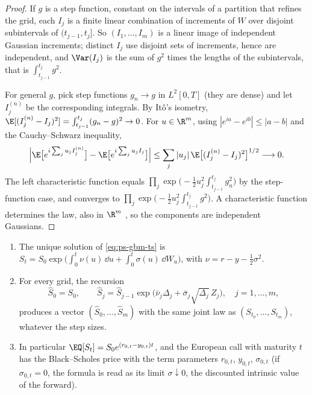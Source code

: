 \begin{proof}
If $g$ is a step function, constant on the intervals of a partition that refines the grid,
each $I_j$ is a finite
linear combination of increments of $W$ over disjoint subintervals of $(t_{j-1},t_j]$. So
$(I_1,\dots,I_m)$ is a linear image of independent Gaussian increments; distinct $I_j$ use
disjoint sets of increments, hence are independent, and $\Var(I_j)$ is the sum of
$g^2$ times the lengths of the subintervals, that is $\int_{t_{j-1}}^{t_j}g^2$.

For general $g$, pick step functions $g_n\to g$ in $L^2[0,T]$ (they are dense) and let
$I^{(n)}_j$ be the corresponding integrals. By It\^o's isometry,
$\E[(I^{(n)}_j-I_j)^2]=\int_{t_{j-1}}^{t_j}(g_n-g)^2\to0$. For $u\in\R^m$, using
$|e^{ia}-e^{ib}|\le|a-b|$ and the Cauchy--Schwarz inequality,
\[
  \Big|\E\big[e^{i\sum_ju_jI^{(n)}_j}\big]-\E\big[e^{i\sum_ju_jI_j}\big]\Big|
  \le\sum_j|u_j|\,\E\big[(I^{(n)}_j-I_j)^2\big]^{1/2}\longrightarrow0 .
\]
The left characteristic function equals $\prod_j\exp\big(-\tfrac12u_j^2\int_{t_{j-1}}^{t_j}g_n^2\big)$
by the step-function case, and converges to $\prod_j\exp\big(-\tfrac12u_j^2\int_{t_{j-1}}^{t_j}g^2\big)$.
A characteristic function determines the law, also in $\R^m$
\citep[Section~3.10]{durrett}, so the components are independent Gaussians.
\end{proof}

\begin{proposition}\label{prop:ps-gbm-exact}
\begin{enumerate}[label=(\roman*)]
  \item The unique solution of \eqref{eq:ps-gbm-ts} is
    $S_t=S_0\exp\big(\int_0^t\nu(u)\,\dd u+\int_0^t\sigma(u)\,\dd W_u\big)$, with
    $\nu=r-y-\tfrac12\sigma^2$.
  \item For every grid, the recursion
    \begin{equation}\label{eq:ps-gbm-step}
      \hat S_0=S_0,\qquad
      \hat S_j=\hat S_{j-1}\exp\big(\bar\nu_j\Delta_j+\bar\sigma_j\sqrt{\Delta_j}\,Z_j\big),
      \quad j=1,\dots,m,
    \end{equation}
    produces a vector $(\hat S_0,\dots,\hat S_m)$ with the same joint law as
    $(S_{t_0},\dots,S_{t_m})$, whatever the step sizes.
  \item In particular $\EQ[S_t]=S_0e^{(r_{0,t}-y_{0,t})t}$, and the European call with
    maturity $t$ has the Black--Scholes price with the term parameters $r_{0,t}$,
    $y_{0,t}$, $\sigma_{0,t}$ (if $\sigma_{0,t}=0$, the formula is read as its limit
    $\sigma\downarrow0$, the discounted intrinsic value of the forward).
\end{enumerate}
\end{proposition}

